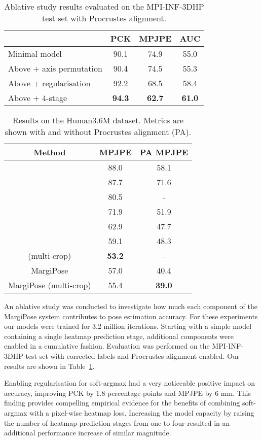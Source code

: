 \documentclass[australian,10pt,twocolumn,letterpaper,twocolumn]{article}
\providecommand{\tabularnewline}{\\}
\newcommand{\ourmodel}{MargiPose}
\begin{document}
\begin{table}
\begin{centering}
\begin{tabular}{lccc}
\hline 
 & PCK & MPJPE & AUC\tabularnewline
\hline 
Minimal model & 90.1 & 74.9 & 55.0\tabularnewline
Above + axis permutation & 90.4 & 74.5 & 55.3\tabularnewline
Above + regularisation & 92.2 & 68.5 & 58.4\tabularnewline
Above + 4-stage & \textbf{94.3} & \textbf{62.7} & \textbf{61.0}\tabularnewline
\hline 
\end{tabular}
\par\end{centering}
\caption{\label{tbl:ablation}Ablative study results evaluated on the MPI-INF-3DHP
test set with Procrustes alignment.}
\end{table}
\begin{table}
\begin{centering}
\begin{tabular}{ccc}
\hline 
Method & MPJPE & PA MPJPE\tabularnewline
\hline 
\citet{kanazawa2017end} & 88.0 & 58.1\tabularnewline
\citet{rogez2017lcr} & 87.7 & 71.6\tabularnewline
\citet{mehta2017vnect} & 80.5 & -\tabularnewline
\citet{pavlakos2017coarse} & 71.9 & 51.9\tabularnewline
\citet{martinez2017simple} & 62.9 & 47.7\tabularnewline
\citet{sun2017compositional} & 59.1 & 48.3\tabularnewline
\citet{luvizon20182d} (multi-crop) & \textbf{53.2} & -\tabularnewline
\hline 
\ourmodel{} & 57.0 & 40.4\tabularnewline
\ourmodel{} (multi-crop) & 55.4 & \textbf{39.0}\tabularnewline
\hline 
\end{tabular}
\par\end{centering}
\caption{\label{tbl:h36m}Results on the Human3.6M dataset. Metrics are shown
with and without Procrustes alignment (PA).}
\end{table}
An ablative study was conducted to investigate how much each component
of the \ourmodel{} system contributes to pose estimation accuracy.
For these experiments our models were trained for 3.2 million iterations.
Starting with a simple model containing a single heatmap prediction
stage, additional components were enabled in a cumulative fashion.
Evaluation was performed on the MPI-INF-3DHP test set with corrected
labels and Procrustes alignment enabled. Our results are shown in
Table~\ref{tbl:ablation}.

Enabling regularisation for soft-argmax had a very noticeable positive
impact on accuracy, improving PCK by 1.8 percentage points and MPJPE
by 6 mm. This finding provides compelling empirical evidence for the
benefits of combining soft-argmax with a pixel-wise heatmap loss.
Increasing the model capacity by raising the number of heatmap prediction
stages from one to four resulted in an additional performance increase
of similar magnitude.
\end{document}
